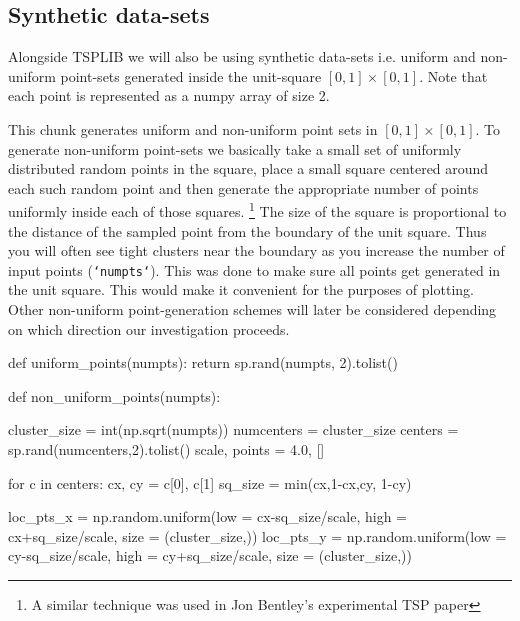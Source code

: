 \subsection{Synthetic data-sets}
Alongside TSPLIB we will also be using synthetic data-sets i.e. uniform and non-uniform point-sets generated inside the unit-square $[0,1] \times [0,1]$. 
Note that each point is represented as a numpy array of size 2. 

This chunk generates uniform and non-uniform point sets in $[0,1] \times [0,1]$. To generate non-uniform point-sets we basically 
take a small set of uniformly distributed random points in the square, place a small square centered around each such random point and then
generate the appropriate number of points uniformly inside each of those squares. \footnote{A similar technique was used in Jon Bentley's experimental TSP paper}
The size of the square is proportional to the distance of the sampled point from the boundary of the unit square. Thus you will often see tight clusters
near the boundary as you increase the number of input points (\texttt{`numpts`}). This was done to make sure all points get generated in the unit square. 
This would make it convenient for the purposes of plotting. Other non-uniform point-generation schemes will later be considered depending on which 
direction our investigation proceeds. 


\nwenddocs{}\endmoddef\nwstartdeflinemarkup{}\nwenddeflinemarkup
def uniform_points(numpts):
     return  sp.rand(numpts, 2).tolist()

def non_uniform_points(numpts):

    cluster_size = int(np.sqrt(numpts)) 
    numcenters   = cluster_size
    centers      = sp.rand(numcenters,2).tolist()
    scale, points = 4.0, []

    for c in centers:
        cx, cy = c[0], c[1]
        sq_size      = min(cx,1-cx,cy, 1-cy)

        loc_pts_x    = np.random.uniform(low  = cx-sq_size/scale, 
                                         high = cx+sq_size/scale, 
                                         size = (cluster_size,))
        loc_pts_y    = np.random.uniform(low = cy-sq_size/scale, 
                                         high = cy+sq_size/scale, 
                                         size = (cluster_size,))

